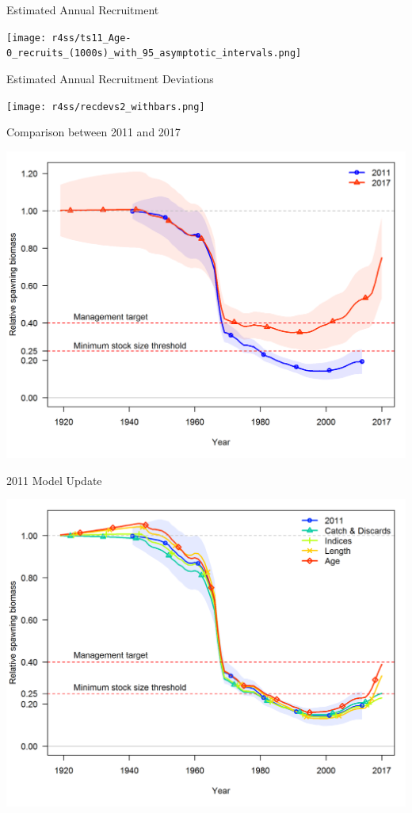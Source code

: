 \documentclass[pdf]{beamer}\usepackage[]{graphicx}\usepackage[]{color}
\begin{document}
\begin{frame}{Estimated Annual Recruitment}
  \begin{center}
    \texttt{[image: r4ss/ts11\_Age-0\_recruits\_(1000s)\_with\_95\_asymptotic\_intervals.png]}
  \end{center}
\end{frame}

\begin{frame}{Estimated Annual Recruitment Deviations}
  \begin{center}
    \texttt{[image: r4ss/recdevs2\_withbars.png]}
  \end{center}
\end{frame}

\begin{frame}{Comparison between 2011 and 2017}
  \begin{center}
    \includegraphics[scale = 0.50]{figures/2011_2017_Bratio.png}
  \end{center}
\end{frame}

\begin{frame}{2011 Model Update}
  \begin{center}
    \includegraphics[scale = 0.50]{figures/compare4_Bratio_uncertainty.png}
  \end{center}
\end{frame}
\end{document}
